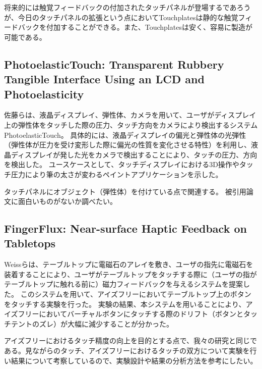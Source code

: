 \documentclass[11pt,a4paper]{jarticle}
\begin{document}
将来的には触覚フィードバックの付加されたタッチパネルが登場するであろうが、今日のタッチパネルの拡張という点においてTouchplatesは静的な触覚フィードバックを付加することができる。また、Touchplatesは安く、容易に製造が可能である。

\subsection{PhotoelasticTouch: Transparent Rubbery Tangible Interface Using an LCD and Photoelasticity\cite{Sato:2009}}
佐藤らは、液晶ディスプレイ、弾性体、カメラを用いて、ユーザがディスプレイ上の弾性体をタッチした際の圧力、タッチ方向をカメラにより検出するシステムPhotoelasticTouch。
具体的には、液晶ディスプレイの偏光と弾性体の光弾性（弾性体が圧力を受け変形した際に偏光の性質を変化させる特性）を利用し、液晶ディスプレイが発した光をカメラで検出することにより、タッチの圧力、方向を検出した。
ユースケースとして、タッチディスプレイにおける3D操作やタッチ圧力により筆の太さが変わるペイントアプリケーションを示した。

タッチパネルにオブジェクト（弾性体）を付けている点で関連する。
被引用論文に面白いものがないか調べたい。

\subsection{FingerFlux: Near-surface Haptic Feedback on Tabletops\cite{Weiss:2011}}
Weissらは、テーブルトップに電磁石のアレイを敷き、ユーザの指先に電磁石を装着することにより、ユーザがテーブルトップをタッチする際に（ユーザの指がテーブルトップに触れる前に）磁力フィードバックを与えるシステムを提案した。
このシステムを用いて、アイズフリーにおいてテーブルトップ上のボタンをタッチする実験を行った。
実験の結果、本システムを用いることにより、アイズフリーにおいてバーチャルボタンにタッチする際のドリフト（ボタンとタッチテントのズレ）が大幅に減少することが分かった。

アイズフリーにおけるタッチ精度の向上を目的とする点で、我々の研究と同じである。見ながらのタッチ、アイズフリーにおけるタッチの双方について実験を行い結果について考察しているので、実験設計や結果の分析方法を参考にしたい。

\end{document}
